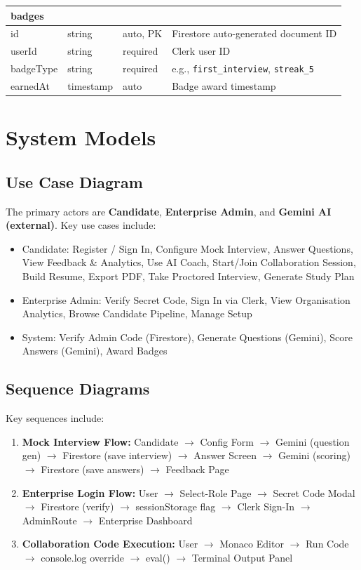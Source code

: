 \documentclass{fisatinternship}
\begin{document}
\begin{longtable}{|p{3.2cm}|p{2cm}|p{2cm}|p{4cm}|}
\multicolumn{4}{|l|}{\textbf{badges}} \\
\hline
id & string & auto, PK & Firestore auto-generated document ID \\
\hline
userId & string & required & Clerk user ID \\
\hline
badgeType & string & required & e.g., \texttt{first\_interview}, \texttt{streak\_5} \\
\hline
earnedAt & timestamp & auto & Badge award timestamp \\
\hline

\end{longtable}

\chapter{System Models}

\section{Use Case Diagram}
The primary actors are \textbf{Candidate}, \textbf{Enterprise Admin}, and
\textbf{Gemini AI (external)}. Key use cases include:
\begin{itemize}
  \item Candidate: Register / Sign In, Configure Mock Interview, Answer Questions,
        View Feedback \& Analytics, Use AI Coach, Start/Join Collaboration Session,
        Build Resume, Export PDF, Take Proctored Interview, Generate Study Plan
  \item Enterprise Admin: Verify Secret Code, Sign In via Clerk, View Organisation
        Analytics, Browse Candidate Pipeline, Manage Setup
  \item System: Verify Admin Code (Firestore), Generate Questions (Gemini),
        Score Answers (Gemini), Award Badges
\end{itemize}

\section{Sequence Diagrams}
Key sequences include:
\begin{enumerate}
  \item \textbf{Mock Interview Flow:} Candidate $\to$ Config Form $\to$ Gemini
        (question gen) $\to$ Firestore (save interview) $\to$ Answer Screen $\to$
        Gemini (scoring) $\to$ Firestore (save answers) $\to$ Feedback Page
  \item \textbf{Enterprise Login Flow:} User $\to$ Select-Role Page $\to$ Secret Code
        Modal $\to$ Firestore (verify) $\to$ sessionStorage flag $\to$ Clerk Sign-In
        $\to$ AdminRoute $\to$ Enterprise Dashboard
  \item \textbf{Collaboration Code Execution:} User $\to$ Monaco Editor $\to$ Run Code
        $\to$ console.log override $\to$ eval() $\to$ Terminal Output Panel
\end{enumerate}
\end{document}
